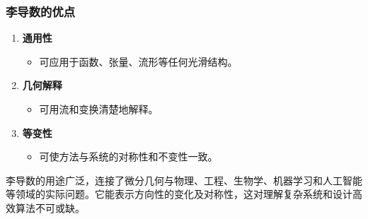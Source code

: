 \subsubsection{李导数的优点}
\begin{enumerate}
  \item \textbf{通用性}
  \begin{itemize}
    \item 可应用于函数、张量、流形等任何光滑结构。
  \end{itemize}
  \item \textbf{几何解释}
  \begin{itemize}
    \item 可用流和变换清楚地解释。
  \end{itemize}
  \item \textbf{等变性}
  \begin{itemize}
    \item 可使方法与系统的对称性和不变性一致。
  \end{itemize}
\end{enumerate}

李导数的用途广泛，连接了微分几何与物理、工程、生物学、机器学习和人工智能等领域的实际问题。它能表示方向性的变化及对称性，这对理解复杂系统和设计高效算法不可或缺。

